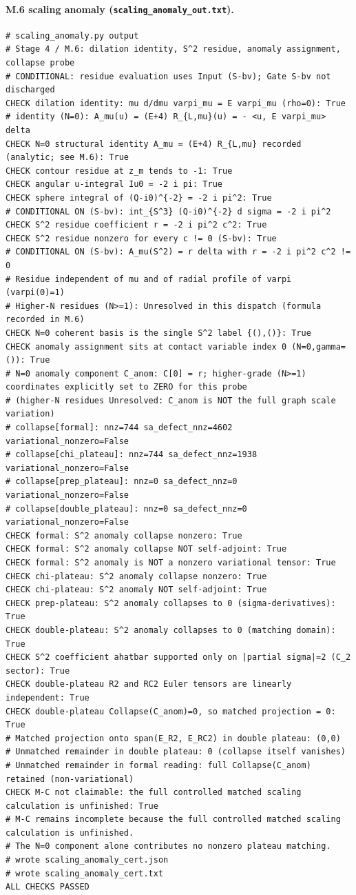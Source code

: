 \documentclass{article}
\theoremstyle{remark}
\begin{document}
\paragraph{M.6 scaling anomaly (\texttt{scaling\_anomaly\_out.txt}).}
\begin{lstlisting}
# scaling_anomaly.py output
# Stage 4 / M.6: dilation identity, S^2 residue, anomaly assignment, collapse probe
# CONDITIONAL: residue evaluation uses Input (S-bv); Gate S-bv not discharged
CHECK dilation identity: mu d/dmu varpi_mu = E varpi_mu (rho=0): True
# identity (N=0): A_mu(u) = (E+4) R_{L,mu}(u) = - <u, E varpi_mu> delta
CHECK N=0 structural identity A_mu = (E+4) R_{L,mu} recorded (analytic; see M.6): True
CHECK contour residue at z_m tends to -1: True
CHECK angular u-integral Iu0 = -2 i pi: True
CHECK sphere integral of (Q-i0)^{-2} = -2 i pi^2: True
# CONDITIONAL ON (S-bv): int_{S^3} (Q-i0)^{-2} d sigma = -2 i pi^2
CHECK S^2 residue coefficient r = -2 i pi^2 c^2: True
CHECK S^2 residue nonzero for every c != 0 (S-bv): True
# CONDITIONAL ON (S-bv): A_mu(S^2) = r delta with r = -2 i pi^2 c^2 != 0
# Residue independent of mu and of radial profile of varpi (varpi(0)=1)
# Higher-N residues (N>=1): Unresolved in this dispatch (formula recorded in M.6)
CHECK N=0 coherent basis is the single S^2 label {(),()}: True
CHECK anomaly assignment sits at contact variable index 0 (N=0,gamma=()): True
# N=0 anomaly component C_anom: C[0] = r; higher-grade (N>=1) coordinates explicitly set to ZERO for this probe
# (higher-N residues Unresolved: C_anom is NOT the full graph scale variation)
# collapse[formal]: nnz=744 sa_defect_nnz=4602 variational_nonzero=False
# collapse[chi_plateau]: nnz=744 sa_defect_nnz=1938 variational_nonzero=False
# collapse[prep_plateau]: nnz=0 sa_defect_nnz=0 variational_nonzero=False
# collapse[double_plateau]: nnz=0 sa_defect_nnz=0 variational_nonzero=False
CHECK formal: S^2 anomaly collapse nonzero: True
CHECK formal: S^2 anomaly collapse NOT self-adjoint: True
CHECK formal: S^2 anomaly is NOT a nonzero variational tensor: True
CHECK chi-plateau: S^2 anomaly collapse nonzero: True
CHECK chi-plateau: S^2 anomaly NOT self-adjoint: True
CHECK prep-plateau: S^2 anomaly collapses to 0 (sigma-derivatives): True
CHECK double-plateau: S^2 anomaly collapses to 0 (matching domain): True
CHECK S^2 coefficient ahatbar supported only on |partial sigma|=2 (C_2 sector): True
CHECK double-plateau R2 and RC2 Euler tensors are linearly independent: True
CHECK double-plateau Collapse(C_anom)=0, so matched projection = 0: True
# Matched projection onto span(E_R2, E_RC2) in double plateau: (0,0)
# Unmatched remainder in double plateau: 0 (collapse itself vanishes)
# Unmatched remainder in formal reading: full Collapse(C_anom) retained (non-variational)
CHECK M-C not claimable: the full controlled matched scaling calculation is unfinished: True
# M-C remains incomplete because the full controlled matched scaling calculation is unfinished.
# The N=0 component alone contributes no nonzero plateau matching.
# wrote scaling_anomaly_cert.json
# wrote scaling_anomaly_cert.txt
ALL CHECKS PASSED
\end{lstlisting}
\end{document}
